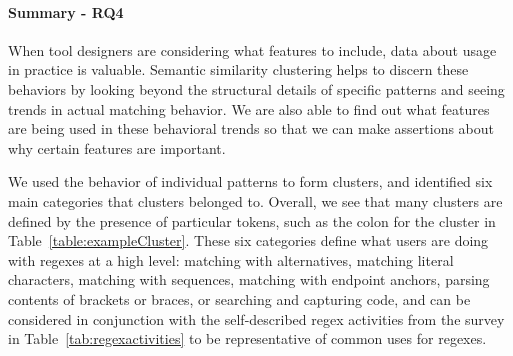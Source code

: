 \paragraph{Summary - RQ4}
When tool designers are considering what features to include, data about usage in practice is valuable.  Semantic similarity clustering  helps to discern these behaviors by looking beyond the structural details of specific patterns and seeing trends in actual matching behavior.  We are also able to find out what features are being used in these behavioral trends so that we can make assertions about why certain features are important.

We used the behavior of individual patterns to form clusters, and identified six main categories that clusters belonged to.  Overall, we see that many clusters are defined by the presence of particular tokens, such as the colon for the cluster in Table~\ref{table:exampleCluster}.
These six categories define what users are doing with regexes at a high level: matching with alternatives, matching literal characters, matching with sequences, matching with endpoint anchors, parsing contents of brackets or braces, or searching and capturing code, and can be considered in conjunction with the self-described regex activities from the survey in Table~\ref{tab:regexactivities} to be representative of common uses for regexes. 


